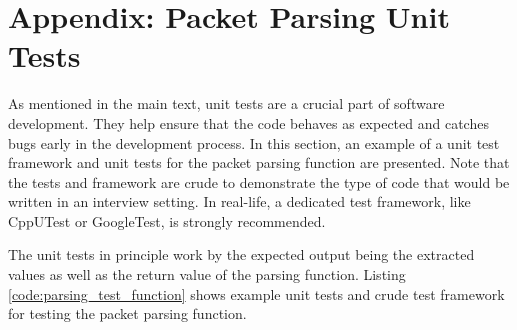 \documentclass[main.tex]{subfiles}
\begin{document}
\section{Appendix: Packet Parsing Unit Tests} \label{appendix:packet_parsing_tests}
As mentioned in the main text, unit tests are a crucial part of software development. They help ensure that the code behaves as expected and catches bugs early in the development process. In this section, an example of a unit test framework and unit tests for the packet parsing function are presented. Note that the tests and framework are crude to demonstrate the type of code that would be written in an interview setting. In real-life, a dedicated test framework, like CppUTest or GoogleTest, is strongly recommended. \newline

\newnoindentpara The unit tests in principle work by the expected output being the extracted values as well as the return value of the parsing function. Listing \ref{code:parsing_test_function} shows example unit tests and crude test framework for testing the packet parsing function.


\end{document}

